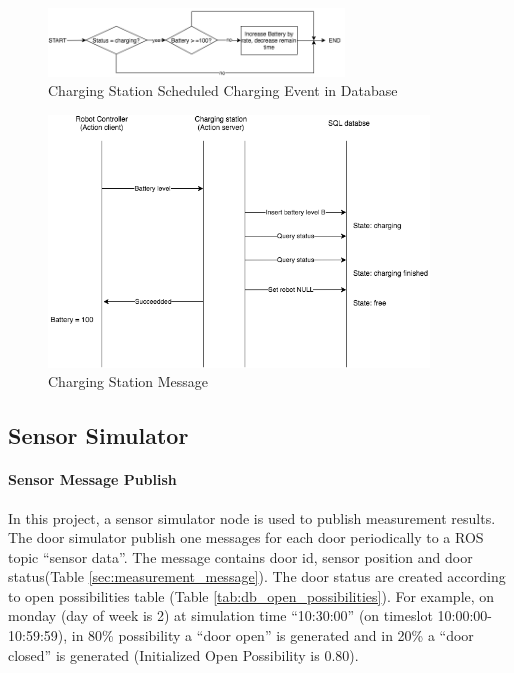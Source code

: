 \begin{figure}[htbp]
    \centering
    \includegraphics[width = 0.7\textwidth]{content/images/ch4/charging_station_charging_event.drawio.png}
    \caption{Charging Station Scheduled Charging Event in Database}
    \label{fig:charging_station_event}
\end{figure}

\begin{figure}[htbp]
    \centering
    \includegraphics[width = 0.9\textwidth]{content/images/ch4/charging_station_message.drawio.png}
    \caption{Charging Station Message}
    \label{fig:charging_station_message}
\end{figure}

\subsection{Sensor Simulator}
\label{sec:sensor_simulatior}

\paragraph{Sensor Message Publish}
In this project, a sensor simulator node is used to publish measurement results. The door simulator publish one messages for each door periodically to a ROS topic ``sensor data''. The message contains door id, sensor position and door status(Table \ref{sec:measurement_message}). The door status are created according to open possibilities table (Table \ref{tab:db_open_possibilities}). For example, on monday (day of week is 2) at simulation time ``10:30:00'' (on timeslot 10:00:00-10:59:59), in 80\% possibility a ``door open'' is generated and in 20\% a ``door closed'' is generated (Initialized Open Possibility is 0.80).

